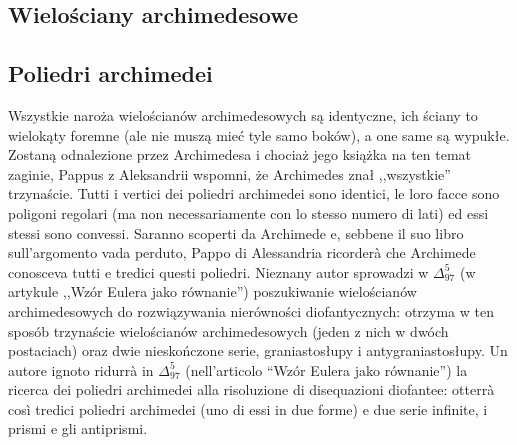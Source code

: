 
\subsection{Wielościany archimedesowe} %
\subsection{Poliedri archimedei} %

Wszystkie naroża wielościanów archimedesowych są identyczne, ich ściany to wielokąty foremne (ale nie muszą mieć tyle samo boków), a one same są wypukłe. %
Zostaną odnalezione przez Archimedesa i chociaż jego książka na ten temat zaginie, Pappus z Aleksandrii wspomni, że Archimedes znał ,,wszystkie'' trzynaście. %
Tutti i vertici dei poliedri archimedei sono identici, le loro facce sono poligoni regolari (ma non necessariamente con lo stesso numero di lati) ed essi stessi sono convessi. %
Saranno scoperti da Archimede e, sebbene il suo libro sull'argomento vada perduto, Pappo di Alessandria ricorderà che Archimede conosceva tutti e tredici questi poliedri. %
Nieznany autor sprowadzi w $\Delta_{97}^5$ (w artykule ,,Wzór Eulera jako równanie'') poszukiwanie wielościanów archimedesowych do rozwiązywania nierówności diofantycznych: otrzyma w ten sposób trzynaście wielościanów archimedesowych (jeden z nich w dwóch postaciach) oraz dwie nieskończone serie, graniastosłupy i antygraniastosłupy. %
Un autore ignoto ridurrà in $\Delta_{97}^5$ (nell'articolo ``Wzór Eulera jako równanie'') la ricerca dei poliedri archimedei alla risoluzione di disequazioni diofantee: otterrà così tredici poliedri archimedei (uno di essi in due forme) e due serie infinite, i prismi e gli antiprismi. %

